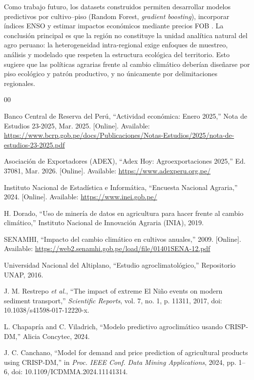 \documentclass[conference]{IEEEtran}
\begin{document}
Como trabajo futuro, los datasets construidos permiten desarrollar modelos predictivos por cultivo--piso (Random Forest, \textit{gradient boosting}), incorporar índices ENSO y estimar impactos económicos mediante precios FOB \cite{chlingaryan2018}. La conclusión principal es que la región no constituye la unidad analítica natural del agro peruano: la heterogeneidad intra-regional exige enfoques de muestreo, análisis y modelado que respeten la estructura ecológica del territorio. Esto sugiere que las políticas agrarias frente al cambio climático deberían diseñarse por piso ecológico y patrón productivo, y no únicamente por delimitaciones regionales.

\begin{thebibliography}{00}

 Banco Central de Reserva del Perú, ``Actividad económica: Enero 2025,'' Nota de Estudios 23-2025, Mar. 2025. [Online]. Available: \url{https://www.bcrp.gob.pe/docs/Publicaciones/Notas-Estudios/2025/nota-de-estudios-23-2025.pdf}

 Asociación de Exportadores (ADEX), ``Adex Hoy: Agroexportaciones 2025,'' Ed. 37081, Mar. 2026. [Online]. Available: \url{https://www.adexperu.org.pe/}

 Instituto Nacional de Estadística e Informática, ``Encuesta Nacional Agraria,'' 2024. [Online]. Available: \url{https://www.inei.gob.pe/}

 H. Dorado, ``Uso de minería de datos en agricultura para hacer frente al cambio climático,'' Instituto Nacional de Innovación Agraria (INIA), 2019.

 SENAMHI, ``Impacto del cambio climático en cultivos anuales,'' 2009. [Online]. Available: \url{https://web2.senamhi.gob.pe/load/file/01401SENA-12.pdf}

 Universidad Nacional del Altiplano, ``Estudio agroclimatológico,'' Repositorio UNAP, 2016.

 J. M. Restrepo \textit{et al.}, ``The impact of extreme El Niño events on modern sediment transport,'' \textit{Scientific Reports}, vol. 7, no. 1, p. 11311, 2017, doi: 10.1038/s41598-017-12220-x.

 L. Chapapría and C. Viladrich, ``Modelo predictivo agroclimático usando CRISP-DM,'' Alicia Concytec, 2024.

 J. C. Canchano, ``Model for demand and price prediction of agricultural products using CRISP-DM,'' in \textit{Proc. IEEE Conf. Data Mining Applications}, 2024, pp. 1--6, doi: 10.1109/ICDMMA.2024.11141314.


\end{thebibliography}
\end{document}

